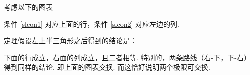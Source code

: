 考虑以下的图表

\begin{center}
    \begin{adjustbox}{scale=1.5}
    \end{adjustbox}
\end{center}

条件 \ref{slcon1} 对应上面的行，条件 \ref{slcon2} 对应左边的列.

定理假设左上半三角形之后得到的结论是：

下面的行成立，右面的列成立，且二者相等. 特别的，两条路线（右-下，下-右）得到同样的结论. 即上面的图表交换. 而这恰好说明两个极限可交换.


